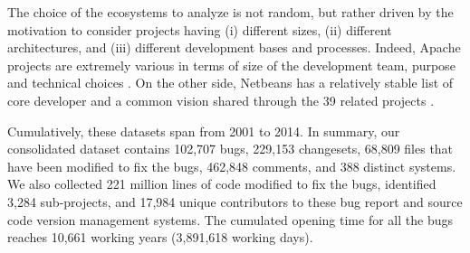 The choice of the ecosystems to analyze is not random, but rather driven by the motivation to consider projects having (i) different sizes, (ii) different architectures, and (iii) different development bases and processes.
Indeed, Apache projects are extremely various in terms of size of the development team, purpose and technical choices \cite{Bavota2013}.
On the other side, Netbeans has a relatively stable list of core developer and a common vision shared through the 39 related projects \cite{Wang2011}.

Cumulatively, these datasets span from 2001 to 2014. In summary, our consolidated dataset contains 102,707 bugs, 229,153 changesets, 68,809 files that have been modified to fix the bugs, 462,848 comments, and 388 distinct systems.
We also collected 221 million lines of code modified to fix the bugs, identified 3,284 sub-projects, and 17,984 unique contributors to these bug report and source code version management systems.
The cumulated opening time for all the bugs reaches 10,661 working years (3,891,618 working days).

